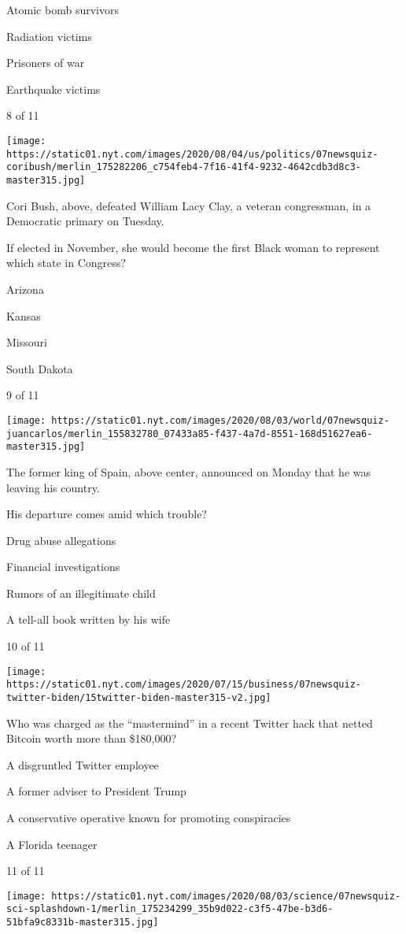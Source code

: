 Atomic bomb survivors

Radiation victims

Prisoners of war

Earthquake victims

8 of 11

\texttt{[image: https://static01.nyt.com/images/2020/08/04/us/politics/07newsquiz-coribush/merlin\_175282206\_c754feb4-7f16-41f4-9232-4642cdb3d8c3-master315.jpg]}

Cori Bush, above, defeated William Lacy Clay, a veteran congressman, in
a Democratic primary on Tuesday.

If elected in November, she would become the first Black woman to
represent which state in Congress?

Arizona

Kansas

Missouri

South Dakota

9 of 11

\texttt{[image: https://static01.nyt.com/images/2020/08/03/world/07newsquiz-juancarlos/merlin\_155832780\_07433a85-f437-4a7d-8551-168d51627ea6-master315.jpg]}

The former king of Spain, above center, announced on Monday that he was
leaving his country.

His departure comes amid which trouble?

Drug abuse allegations

Financial investigations

Rumors of an illegitimate child

A tell-all book written by his wife

10 of 11

\texttt{[image: https://static01.nyt.com/images/2020/07/15/business/07newsquiz-twitter-biden/15twitter-biden-master315-v2.jpg]}

Who was charged as the ``mastermind'' in a recent Twitter hack that
netted Bitcoin worth more than \$180,000?

A disgruntled Twitter employee

A former adviser to President Trump

A conservative operative known for promoting conspiracies

A Florida teenager

11 of 11

\texttt{[image: https://static01.nyt.com/images/2020/08/03/science/07newsquiz-sci-splashdown-1/merlin\_175234299\_35b9d022-c3f5-47be-b3d6-51bfa9c8331b-master315.jpg]}

